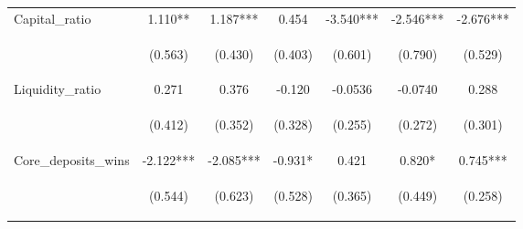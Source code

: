 \documentclass[]{article}
\begin{document}
\begin{center}
\begin{tabular}{lcccccc}
Capital\_ratio & 1.110** & 1.187*** & 0.454 & -3.540*** & -2.546*** & -2.676*** \\
\vspace{4pt} & \begin{footnotesize}(0.563)\end{footnotesize} & \begin{footnotesize}(0.430)\end{footnotesize} & \begin{footnotesize}(0.403)\end{footnotesize} & \begin{footnotesize}(0.601)\end{footnotesize} & \begin{footnotesize}(0.790)\end{footnotesize} & \begin{footnotesize}(0.529)\end{footnotesize} \\
Liquidity\_ratio & 0.271 & 0.376 & -0.120 & -0.0536 & -0.0740 & 0.288 \\
\vspace{4pt} & \begin{footnotesize}(0.412)\end{footnotesize} & \begin{footnotesize}(0.352)\end{footnotesize} & \begin{footnotesize}(0.328)\end{footnotesize} & \begin{footnotesize}(0.255)\end{footnotesize} & \begin{footnotesize}(0.272)\end{footnotesize} & \begin{footnotesize}(0.301)\end{footnotesize} \\
Core\_deposits\_wins & -2.122*** & -2.085*** & -0.931* & 0.421 & 0.820* & 0.745*** \\
\vspace{4pt} & \begin{footnotesize}(0.544)\end{footnotesize} & \begin{footnotesize}(0.623)\end{footnotesize} & \begin{footnotesize}(0.528)\end{footnotesize} & \begin{footnotesize}(0.365)\end{footnotesize} & \begin{footnotesize}(0.449)\end{footnotesize} & \begin{footnotesize}(0.258)\end{footnotesize} \\

\end{tabular}
\end{center}
\end{document}
